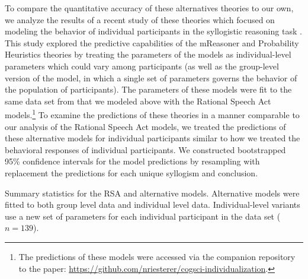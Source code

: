 \documentclass[floatsintext, doc]{apa6}
\begin{document}
To compare the quantitative accuracy of these alternatives theories to our own, we analyze the results of a recent study of these theories which focused on modeling the behavior of individual participants in the syllogistic reasoning task \cite{riesterer2020models}.
This study explored the predictive capabilities of the mReasoner and Probability Heuristics theories by treating the parameters of the models as individual-level parameters which could vary among participants (as well as the group-level version of the model, in which a single set of parameters governs the behavior of the population of participants). 
The parameters of these models were fit to the same data set from  that we modeled above with the Rational Speech Act models.\footnote{The predictions of these models were accessed via the companion repository to the paper: \url{https://github.com/nriesterer/cogsci-individualization}.}
To examine the predictions of these theories in a manner comparable to our analysis of the Rational Speech Act models, we treated the predictions of these alternative models for individual participants similar to how we treated the behavioral responses of individual participants. 
We constructed bootstrapped 95\% confidence intervals for the model predictions by resampling with replacement the predictions for each unique syllogism and conclusion. 



\begin{center}
\begin{table}[h]
\centering
{}\caption{Summary statistics for the RSA and alternative models. Alternative models were fitted to both group level data and individual level data. Individual-level variants use a new set of parameters for each individual participant in the data set ($n=139$).}\label{tab:altStats}
\end{table}
\end{center}
\end{document}
